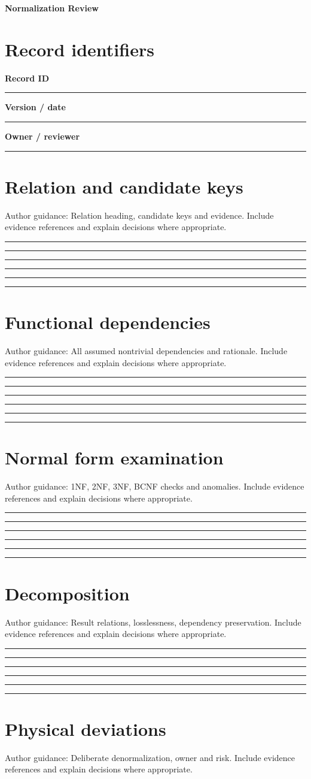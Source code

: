 \documentclass[11pt,letterpaper]{article}
\newcommand{\ResponseLine}{\par\vspace{1.05em}\noindent\rule{\linewidth}{0.4pt}\par}
\newcommand{\ResponseArea}{\ResponseLine\ResponseLine\ResponseLine}
\begin{document}
\begin{center}
{\LARGE\bfseries\color{navy} Normalization Review}\par
\vspace{0.25em}{\large Authoring Template | guided fields}\par
{}
\end{center}
\vspace{0.8em}
\section{Record identifiers}
\textbf{Record ID}\ResponseLine\textbf{Version / date}\ResponseLine\textbf{Owner / reviewer}\ResponseLine
\section{Relation and candidate keys}
Author guidance: Relation heading, candidate keys and evidence. Include evidence references and explain decisions where appropriate.


\ResponseArea\ResponseArea
\section{Functional dependencies}
Author guidance: All assumed nontrivial dependencies and rationale. Include evidence references and explain decisions where appropriate.


\ResponseArea\ResponseArea
\section{Normal form examination}
Author guidance: 1NF, 2NF, 3NF, BCNF checks and anomalies. Include evidence references and explain decisions where appropriate.


\ResponseArea\ResponseArea
\section{Decomposition}
Author guidance: Result relations, losslessness, dependency preservation. Include evidence references and explain decisions where appropriate.


\ResponseArea\ResponseArea
\section{Physical deviations}
Author guidance: Deliberate denormalization, owner and risk. Include evidence references and explain decisions where appropriate.
\end{document}
